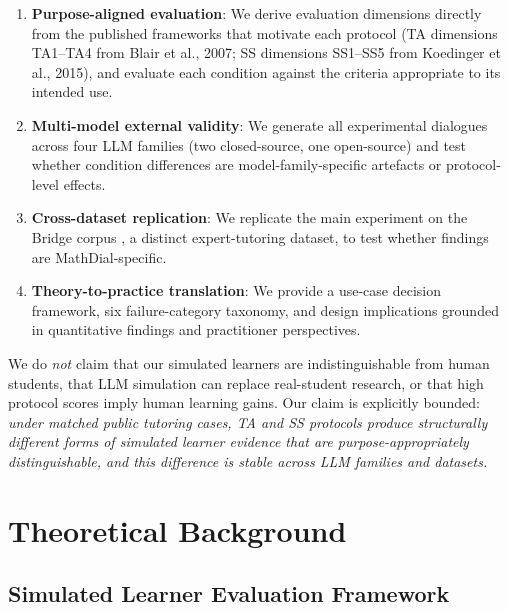 \documentclass[12pt]{article}
\begin{document}
\begin{enumerate}
    \item \textbf{Purpose-aligned evaluation}: We derive evaluation dimensions directly
          from the published frameworks that motivate each protocol (TA dimensions TA1--TA4
          from Blair et al., 2007; SS dimensions SS1--SS5 from Koedinger et al., 2015),
          and evaluate each condition against the criteria appropriate to its intended use.

    \item \textbf{Multi-model external validity}: We generate all experimental dialogues
          across four LLM families (two closed-source, one open-source) and test whether
          condition differences are model-family-specific artefacts or protocol-level effects.

    \item \textbf{Cross-dataset replication}: We replicate the main experiment on the
          Bridge corpus \citep{wang2024bridge}, a distinct expert-tutoring dataset, to test
          whether findings are MathDial-specific.

    \item \textbf{Theory-to-practice translation}: We provide a use-case decision framework,
          six failure-category taxonomy, and design implications grounded in quantitative
          findings and practitioner perspectives.
\end{enumerate}

We do \emph{not} claim that our simulated learners are indistinguishable from human students,
that LLM simulation can replace real-student research, or that high protocol scores imply
human learning gains. Our claim is explicitly bounded: \emph{under matched public tutoring
cases, TA and SS protocols produce structurally different forms of simulated learner evidence
that are purpose-appropriately distinguishable, and this difference is stable across LLM
families and datasets.}

\section{Theoretical Background}

\subsection{Simulated Learner Evaluation Framework}
\end{document}
